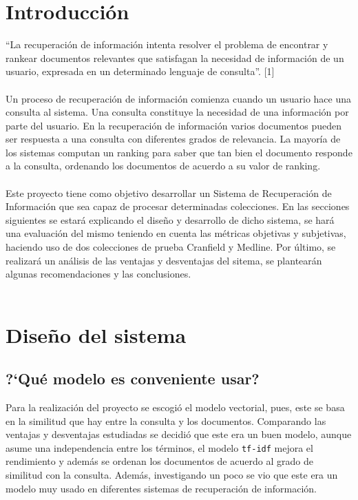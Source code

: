 \documentclass{llncs}
\begin{document}
%
\section{Introducci\'on}
%

``La recuperaci\'on de informaci\'on intenta resolver el problema de encontrar y rankear documentos relevantes que satisfagan la necesidad de informaci\'on de un usuario, expresada en un determinado lenguaje de consulta''. [1]
\\\\
Un proceso de recuperaci\'on de informaci\'on comienza cuando un usuario hace una consulta al sistema. Una consulta constituye la necesidad de una informaci\'on por parte del usuario. En la recuperaci\'on de informaci\'on varios documentos pueden ser respuesta a una consulta con diferentes grados de relevancia. La mayor\'ia de los sistemas computan un ranking para saber que tan bien el documento responde a la consulta, ordenando los documentos de acuerdo a su valor de ranking.
\\\\
Este proyecto tiene como objetivo desarrollar un Sistema de Recuperaci\'on de Informaci\'on que sea capaz de procesar determinadas colecciones. En las secciones siguientes se estar\'a explicando el dise\~no y desarrollo de dicho sistema, se har\'a una evaluaci\'on del mismo teniendo en cuenta las m\'etricas objetivas y subjetivas, haciendo uso de dos colecciones de prueba Cranfield y Medline. Por \'ultimo, se realizar\'a un an\'alisis de las ventajas y desventajas del sitema, se plantear\'an algunas recomendaciones y las conclusiones.
\\\\

%
\section{Dise\~no del sistema}
%

\subsection{?`Qu\'e modelo es conveniente usar?}
Para la realizaci\'on del proyecto se escogi\'o el modelo vectorial, pues, este se basa en la similitud que hay entre la consulta y los documentos. Comparando las ventajas y desventajas estudiadas se decidi\'o que este era un buen modelo, aunque asume una independencia entre los t\'erminos, el modelo \texttt{tf-idf} mejora el rendimiento y adem\'as se ordenan los documentos de acuerdo al grado de similitud con la consulta. Adem\'as, investigando un poco se vio que este era un modelo muy usado en diferentes sistemas de recuperaci\'on de informaci\'on.\\
\end{document}
